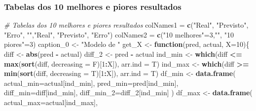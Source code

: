 \documentclass[]{article}
\newenvironment{Shaded}{\begin{snugshade}}{\end{snugshade}}
\newcommand{\CommentTok}[1]{\textcolor[rgb]{0.56,0.35,0.01}{\textit{#1}}}
\newcommand{\ControlFlowTok}[1]{\textcolor[rgb]{0.13,0.29,0.53}{\textbf{#1}}}
\newcommand{\DataTypeTok}[1]{\textcolor[rgb]{0.13,0.29,0.53}{#1}}
\newcommand{\DecValTok}[1]{\textcolor[rgb]{0.00,0.00,0.81}{#1}}
\newcommand{\KeywordTok}[1]{\textcolor[rgb]{0.13,0.29,0.53}{\textbf{#1}}}
\newcommand{\NormalTok}[1]{#1}
\newcommand{\OperatorTok}[1]{\textcolor[rgb]{0.81,0.36,0.00}{\textbf{#1}}}
\newcommand{\StringTok}[1]{\textcolor[rgb]{0.31,0.60,0.02}{#1}}
\begin{document}
\hypertarget{tabelas-dos-10-melhores-e-piores-resultados}{%
\subsubsection{Tabelas dos 10 melhores e piores
resultados}\label{tabelas-dos-10-melhores-e-piores-resultados}}

\label{show-table-10}

\begin{Shaded}
\begin{Highlighting}[]
\CommentTok{# Tabelas dos 10 melhores e piores resultados}
\NormalTok{colNames1 =}\StringTok{ }\KeywordTok{c}\NormalTok{(}\StringTok{"Real"}\NormalTok{, }\StringTok{"Previsto"}\NormalTok{, }\StringTok{"Erro"}\NormalTok{, }\StringTok{""}\NormalTok{,}\StringTok{"Real"}\NormalTok{, }\StringTok{"Previsto"}\NormalTok{, }\StringTok{"Erro"}\NormalTok{) }
\NormalTok{colNames2 =}\StringTok{ }\KeywordTok{c}\NormalTok{(}\StringTok{"10 melhores"}\NormalTok{=}\DecValTok{3}\NormalTok{,}\StringTok{""}\NormalTok{, }\StringTok{"10 piores"}\NormalTok{=}\DecValTok{3}\NormalTok{)}
\NormalTok{caption_}\DecValTok{0}\NormalTok{ <-}\StringTok{ "Modelo de "}
\NormalTok{get_X <-}\StringTok{ }\ControlFlowTok{function}\NormalTok{(pred, actual, }\DataTypeTok{X=}\DecValTok{10}\NormalTok{)\{}
\NormalTok{  diff <-}\StringTok{ }\KeywordTok{abs}\NormalTok{(pred }\OperatorTok{-}\StringTok{ }\NormalTok{actual)}
\NormalTok{  diff_}\DecValTok{2}\NormalTok{ <-}\StringTok{ }\NormalTok{pred }\OperatorTok{-}\StringTok{ }\NormalTok{actual}
\NormalTok{  ind_min <-}\StringTok{ }\KeywordTok{which}\NormalTok{(diff }\OperatorTok{<=}\StringTok{ }\KeywordTok{max}\NormalTok{(}\KeywordTok{sort}\NormalTok{(diff, }\DataTypeTok{decreasing =}\NormalTok{ F)[}\DecValTok{1}\OperatorTok{:}\NormalTok{X]), }\DataTypeTok{arr.ind =}\NormalTok{ T)}
\NormalTok{  ind_max <-}\StringTok{ }\KeywordTok{which}\NormalTok{(diff }\OperatorTok{>=}\StringTok{ }\KeywordTok{min}\NormalTok{(}\KeywordTok{sort}\NormalTok{(diff, }\DataTypeTok{decreasing =}\NormalTok{ T)[}\DecValTok{1}\OperatorTok{:}\NormalTok{X]), }\DataTypeTok{arr.ind =}\NormalTok{ T)}
\NormalTok{  df_min <-}\StringTok{ }\KeywordTok{data.frame}\NormalTok{(}
    \DataTypeTok{actual_min=}\NormalTok{actual[ind_min],}
    \DataTypeTok{pred_min=}\NormalTok{pred[ind_min],}
    \DataTypeTok{diff_min=}\NormalTok{diff[ind_min],}
    \DataTypeTok{diff_min_2=}\NormalTok{diff_}\DecValTok{2}\NormalTok{[ind_min]}
\NormalTok{  )}
\NormalTok{  df_max <-}\StringTok{ }\KeywordTok{data.frame}\NormalTok{(}
    \DataTypeTok{actual_max=}\NormalTok{actual[ind_max],}

\end{Highlighting}
\end{Shaded}
\end{document}
